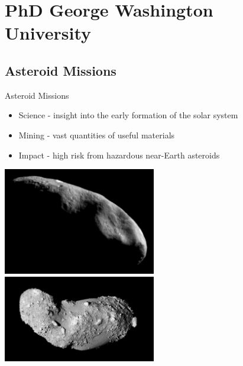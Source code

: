 
\section[PhD Research]{PhD George Washington University}

\subsection[Asteroid Missions]{Asteroid Missions}

\begin{frame}{Asteroid Missions}
\begin{itemize}
    \item Science - insight into the early formation of the solar system
    \item Mining - vast quantities of useful materials
    \item Impact - high risk from hazardous near-Earth asteroids
\end{itemize}    

\begin{center}
    \includegraphics[height=0.5\textheight,width=0.5\textwidth,keepaspectratio]{figures/defense/near_mos_20001203_full.jpg}
    ~
    \includegraphics[height=0.5\textheight,width=0.5\textwidth,keepaspectratio]{figures/defense/Itokawa8_hayabusa_1210.jpg}
\end{center}
\end{frame}

